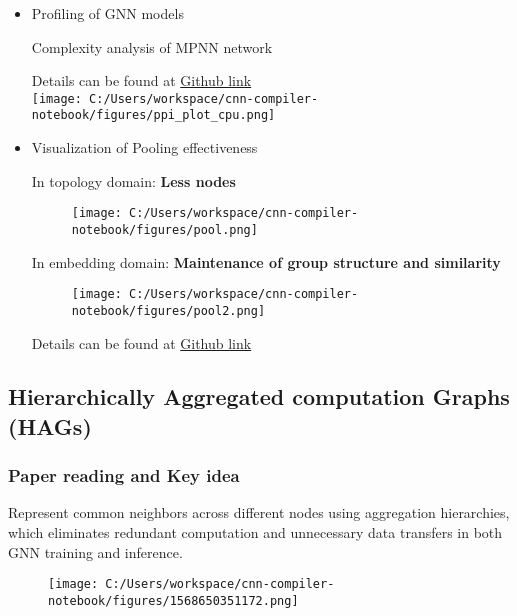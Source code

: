 \documentclass[]{article}
\begin{document}
\begin{itemize}
\item
  Profiling of GNN models

  Complexity analysis of MPNN network

  Details can be found at
  \href{https://github.com/OrdinaryCrazy/cnn-compiler-notebook/blob/master/weekly-report/weeklyreport0722-0728.pdf}{Github
  link}\\
  \texttt{[image: C:/Users/workspace/cnn-compiler-notebook/figures/ppi\_plot\_cpu.png]}
\item
  Visualization of Pooling effectiveness

  In topology domain: \textbf{Less nodes}

  \begin{figure}
  \centering
  \texttt{[image: C:/Users/workspace/cnn-compiler-notebook/figures/pool.png]}
  \caption{}
  \end{figure}

  In embedding domain: \textbf{Maintenance of group structure and
  similarity}

  \begin{figure}
  \centering
  \texttt{[image: C:/Users/workspace/cnn-compiler-notebook/figures/pool2.png]}
  \caption{}
  \end{figure}

  Details can be found at
  \href{https://github.com/OrdinaryCrazy/cnn-compiler-notebook/blob/master/GNN-jupyter-code/topk-pooling\%20visualization.ipynb}{Github
  link}
\end{itemize}

\hypertarget{header-n1851}{%
\subsection{Hierarchically Aggregated computation Graphs
(HAGs)}\label{header-n1851}}

\hypertarget{header-n1852}{%
\subsubsection{Paper reading and Key idea}\label{header-n1852}}

Represent common neighbors across different nodes using aggregation
hierarchies, which eliminates redundant computation and unnecessary data
transfers in both GNN training and inference.

\begin{figure}
\centering
\texttt{[image: C:/Users/workspace/cnn-compiler-notebook/figures/1568650351172.png]}
\caption{}
\end{figure}
\end{document}

